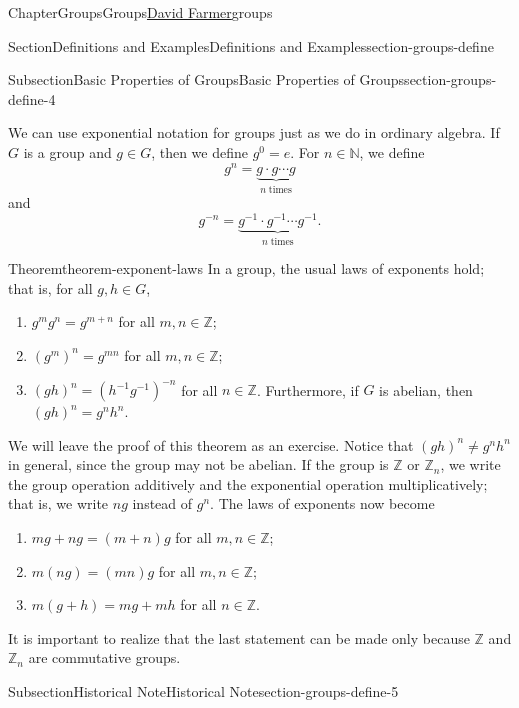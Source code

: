 \documentclass[oneside,10pt,]{book}
\numberwithin{equation}{section}
\begin{document}
\begin{chapterptx}{Chapter}{Groups}{}{Groups}{\hyperlink{dfarmer}{David Farmer}}{}{groups}
\begin{sectionptx}{Section}{Definitions and Examples}{}{Definitions and Examples}{}{}{section-groups-define}
\begin{subsectionptx}{Subsection}{Basic Properties of Groups}{}{Basic Properties of Groups}{}{}{section-groups-define-4}
\par
We can use exponential notation for groups just as we do in ordinary algebra. If \(G\) is a group and \(g \in G\), then we define \(g^0 = e\). For \(n \in {\mathbb N}\), we define%
\begin{equation*}
g^n = \underbrace{g \cdot g \cdots g}_{n \; \text{times}}
\end{equation*}
and%
\begin{equation*}
g^{-n} = \underbrace{g^{-1} \cdot g^{-1} \cdots g^{-1}}_{n \; \text{times}}\text{.}
\end{equation*}
%
\begin{theorem}{Theorem}{}{}{theorem-exponent-laws}%
In a group, the usual laws of exponents hold; that is, for all \(g, h \in G\),%
\begin{enumerate}
\item{}\(g^mg^n = g^{m+n}\) for all \(m, n \in {\mathbb Z}\);%
\item{}\((g^m)^n = g^{mn}\) for all \(m, n \in {\mathbb Z}\);%
\item{}\((gh)^n = (h^{-1}g^{-1})^{-n}\) for all \(n \in {\mathbb Z}\). Furthermore, if \(G\) is abelian, then \((gh)^n = g^nh^n\).%
\end{enumerate}
%
\end{theorem}
We will leave the proof of this theorem as an exercise. Notice that \((gh)^n \neq g^nh^n\) in general, since the group may not be abelian. If the group is \({\mathbb Z}\) or \({\mathbb Z}_n\), we write the group operation additively and the exponential operation multiplicatively; that is, we write \(ng\) instead of \(g^n\). The laws of exponents now become%
\begin{enumerate}
\item{}\(mg + ng = (m+n)g\) for all \(m, n \in {\mathbb Z}\);%
\item{}\(m(ng) = (mn)g\) for all \(m, n \in {\mathbb Z}\);%
\item{}\(m(g + h) = mg + mh\) for all \(n \in {\mathbb Z}\).%
\end{enumerate}
%
\par
It is important to realize that the last statement can be made only because \({\mathbb Z}\) and  \({\mathbb Z}_n\) are commutative groups.%
\end{subsectionptx}
%
%
\typeout{************************************************}
\typeout{************************************************}
%
\begin{subsectionptx}{Subsection}{Historical Note}{}{Historical Note}{}{}{section-groups-define-5}

\end{subsectionptx}
\end{sectionptx}
\end{chapterptx}
\end{document}
